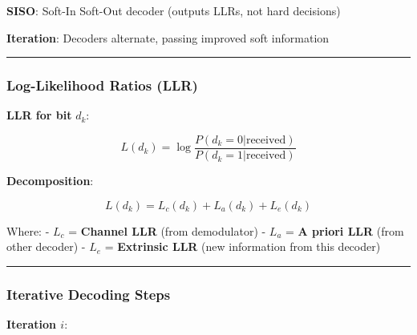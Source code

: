\textbf{SISO}: Soft-In Soft-Out decoder (outputs LLRs, not hard
decisions)

\textbf{Iteration}: Decoders alternate, passing improved soft
information

\begin{center}\rule{0.5\linewidth}{0.5pt}\end{center}

\subsubsection{Log-Likelihood Ratios
(LLR)}\label{log-likelihood-ratios-llr}

\textbf{LLR for bit} \(d_k\):

\[
L(d_k) = \log\frac{P(d_k = 0 | \text{received})}{P(d_k = 1 | \text{received})}
\]

\textbf{Decomposition}:

\[
L(d_k) = L_c(d_k) + L_a(d_k) + L_e(d_k)
\]

Where: - \(L_c\) = \textbf{Channel LLR} (from demodulator) - \(L_a\) =
\textbf{A priori LLR} (from other decoder) - \(L_e\) = \textbf{Extrinsic
LLR} (new information from this decoder)

\begin{center}\rule{0.5\linewidth}{0.5pt}\end{center}

\subsubsection{Iterative Decoding Steps}\label{iterative-decoding-steps}

\textbf{Iteration \(i\)}:

